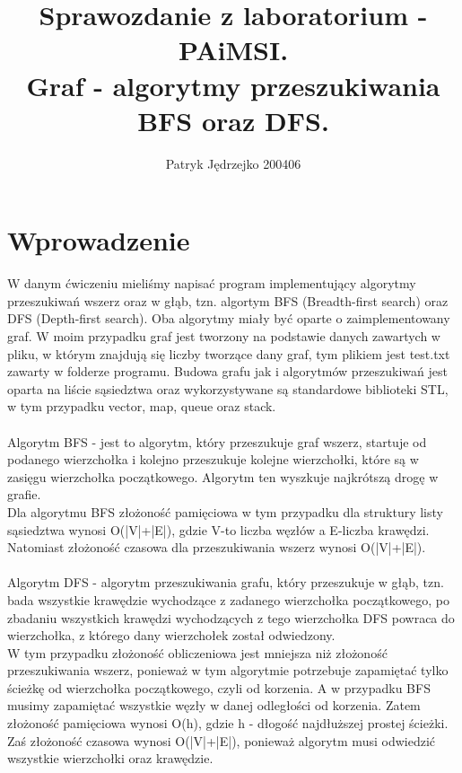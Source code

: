 \documentclass{article}
\author{Patryk Jędrzejko 200406}
\title{Sprawozdanie z laboratorium - PAiMSI. \\Graf - algorytmy przeszukiwania BFS oraz DFS.}
\begin{document}
\maketitle

\section{Wprowadzenie}
W danym ćwiczeniu mieliśmy napisać program implementujący algorytmy przeszukiwań wszerz oraz w głąb, tzn.
algortym BFS (Breadth-first search) oraz DFS (Depth-first search). Oba algorytmy miały być oparte o zaimplementowany graf. W moim przypadku graf jest tworzony na podstawie danych zawartych w pliku, w którym
znajdują się liczby tworzące dany graf, tym plikiem jest test.txt zawarty w folderze programu. Budowa grafu jak i 
algorytmów przeszukiwań jest oparta na liście sąsiedztwa oraz wykorzystywane są standardowe biblioteki STL, w tym przypadku vector, map, queue oraz stack.
\\\\Algorytm BFS - jest to algorytm, który przeszukuje graf wszerz, startuje od podanego wierzchołka i kolejno 
przeszukuje kolejne wierzchołki, które są w zasięgu wierzchołka początkowego. Algorytm ten wyszkuje najkrótszą drogę w grafie.
\\ Dla algorytmu BFS złożoność pamięciowa w tym przypadku dla struktury listy sąsiedztwa wynosi O(|V|+|E|), gdzie V-to liczba węzłów a E-liczba krawędzi.
\\Natomiast złożoność czasowa dla przeszukiwania wszerz wynosi O(|V|+|E|).
\\\\Algorytm DFS - algorytm przeszukiwania grafu, który przeszukuje w głąb, tzn. bada wszystkie krawędzie wychodzące z zadanego wierzchołka początkowego, po zbadaniu wszystkich krawędzi wychodzących z tego wierzchołka DFS powraca do wierzchołka, z którego dany wierzchołek został odwiedzony.
\\W tym przypadku złożoność obliczeniowa jest mniejsza niż złożoność przeszukiwania wszerz, ponieważ w tym algorytmie potrzebuje zapamiętać tylko ścieżkę od wierzchołka początkowego, czyli od korzenia. A w przypadku BFS musimy zapamiętać wszystkie węzły w danej odległości od korzenia. Zatem złożoność pamięciowa wynosi O(h), gdzie h - dłogość najdłuższej prostej ścieżki.
\\Zaś złożoność czasowa wynosi O(|V|+|E|), ponieważ algorytm musi odwiedzić wszystkie wierzchołki oraz krawędzie.
\end{document}
